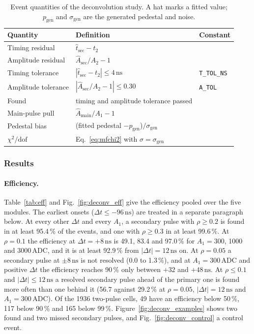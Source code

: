 \documentclass[11pt]{article}
\newcommand{\ns}{\,\mathrm{ns}}
\newcommand{\adc}{\,\mathrm{ADC}}
\newcommand{\code}[1]{\texttt{#1}}
\begin{document}
\begin{table}[htbp]
\centering
\caption{Event quantities of the deconvolution study. A hat marks a fitted value; $p_{\mathrm{gen}}$ and $\sigma_{\mathrm{gen}}$ are the generated pedestal and noise.}
\label{tab:deconvdef}
\small
\begin{tabular}{lll}
\toprule
Quantity & Definition & Constant \\
\midrule
Timing residual & $\hat t_{\mathrm{sec}} - t_2$ & \\
Amplitude residual & $\hat A_{\mathrm{sec}}/A_2 - 1$ & \\
Timing tolerance & $|\hat t_{\mathrm{sec}} - t_2| \le 4\ns$ & \code{T\_TOL\_NS} \\
Amplitude tolerance & $|\hat A_{\mathrm{sec}}/A_2 - 1| \le 0.30$ & \code{A\_TOL} \\
Found & timing and amplitude tolerance passed & \\
Main-pulse pull & $\hat A_{\mathrm{main}}/A_1 - 1$ & \\
Pedestal bias & (fitted pedestal $- p_{\mathrm{gen}}$)$/\sigma_{\mathrm{gen}}$ & \\
$\chi^2/\mathrm{dof}$ & Eq.~\eqref{eq:mfchi2} with $\sigma = \sigma_{\mathrm{gen}}$ & \\
\bottomrule
\end{tabular}
\end{table}

\subsubsection{Results}

\paragraph{Efficiency.} Table~\ref{tab:eff} and Fig.~\ref{fig:deconv_eff} give the efficiency pooled over the five modules. The earliest onsets ($\Delta t \le -96\ns$) are treated in a separate paragraph below. At every other $\Delta t$ and every $A_1$, a secondary pulse with $\rho \ge 0.2$ is found in at least 95.4\,\% of the events, and one with $\rho \ge 0.3$ in at least 99.6\,\%. At $\rho = 0.1$ the efficiency at $\Delta t = +8\ns$ is 49.1, 83.4 and 97.0\,\% for $A_1 = 300$, 1000 and 3000\,ADC, and it is at least 92.9\,\% from $|\Delta t| = 12\ns$ on. At $\rho = 0.05$ a secondary pulse at $\pm 8\ns$ is not resolved (0.0 to 1.3\,\%), and at $A_1 = 300\adc$ and positive $\Delta t$ the efficiency reaches 90\,\% only between $+32$ and $+48\ns$. At $\rho \le 0.1$ and $|\Delta t| \le 12\ns$ a resolved secondary pulse ahead of the primary one is found more often than one behind it (56.7 against 29.2\,\% at $\rho = 0.05$, $|\Delta t| = 12\ns$ and $A_1 = 300\adc$). Of the 1936 two-pulse cells, 49 have an efficiency below 50\,\%, 117 below 90\,\% and 165 below 99\,\%. Figure~\ref{fig:deconv_examples} shows two found and two missed secondary pulses, and Fig.~\ref{fig:deconv_control} a control event.
\end{document}
